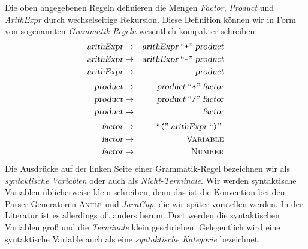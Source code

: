 Die oben angegebenen Regeln definieren die Mengen \textsl{Factor}, \textsl{Product} und
\textsl{ArithExpr} durch wechselseitige Rekursion.
Diese Definition k\"onnen  wir in Form von sogenannten \emph{Grammatik-Regeln} wesentlich
kompakter schreiben:
\begin{eqnarray*}
  \textsl{arithExpr} & \rightarrow & \textsl{arithExpr} \;\mbox{``\texttt{+}''}\; \textsl{product}  \\
  \textsl{arithExpr} & \rightarrow & \textsl{arithExpr} \;\mbox{``\texttt{-}''}\; \textsl{product}  \\
  \textsl{arithExpr} & \rightarrow & \textsl{product}                                \\[0.1cm]
  \textsl{product}   & \rightarrow & \textsl{product} \;\mbox{``\texttt{*}''}\; \textsl{factor}     \\
  \textsl{product}   & \rightarrow & \textsl{product} \;\mbox{``\texttt{/}''}\; \textsl{factor}     \\
  \textsl{product}   & \rightarrow & \textsl{factor}                                 \\[0.1cm]
  \textsl{factor}    & \rightarrow & \;\mbox{``\texttt{(}''}\; \textsl{arithExpr} \;\mbox{``\texttt{)}''}\;        \\
  \textsl{factor}    & \rightarrow & \textsc{Variable}                               \\
  \textsl{factor}    & \rightarrow & \textsc{Number} 
\end{eqnarray*}
Die Ausdr\"ucke auf der linken Seite einer Grammatik-Regel bezeichnen wir als
\emph{syntaktische Variablen} oder auch als \emph{Nicht-Terminale}.  
Wir werden syntaktische Variablen \"ublicherweise klein schreiben, denn das ist die Konvention
bei den  Parser-Generatoren \textsc{Antlr} und \textsl{JavaCup}, die wir sp\"ater vorstellen werden. 
In der Literatur ist es allerdings oft anders herum.  Dort werden die syntaktischen Variablen gro{\ss} und
die \emph{Terminale}  klein geschrieben.  Gelegentlich wird eine
syntaktische Variable auch als eine \emph{syntaktische Kategorie} bezeichnet.
 

